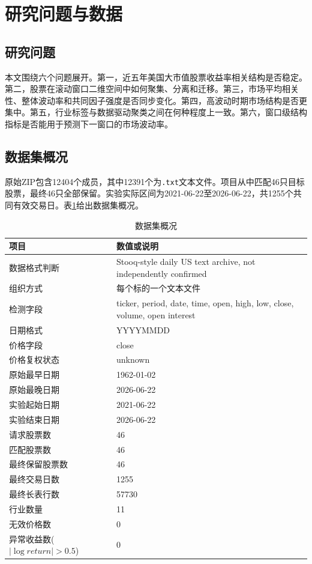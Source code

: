 \documentclass[UTF8,zihao=-4]{ctexart}
\begin{document}
\section{研究问题与数据}
\subsection{研究问题}
本文围绕六个问题展开。第一，近五年美国大市值股票收益率相关结构是否稳定。第二，股票在滚动窗口二维空间中如何聚集、分离和迁移。第三，市场平均相关性、整体波动率和共同因子强度是否同步变化。第四，高波动时期市场结构是否更集中。第五，行业标签与数据驱动聚类之间在何种程度上一致。第六，窗口级结构指标是否能用于预测下一窗口的市场波动率。

\subsection{数据集概况}
原始ZIP包含12404个成员，其中12391个为\texttt{.txt}文本文件。项目从中匹配46只目标股票，最终46只全部保留。实验实际区间为2021-06-22至2026-06-22，共1255个共同有效交易日。表\ref{tab:data-overview}给出数据集概况。

\begin{table}[H]
\centering
\caption{数据集概况}
\label{tab:data-overview}
\small
\begin{tabular}{p{}p{}}
\toprule
项目 & 数值或说明 \\
\midrule
数据格式判断 & Stooq-style daily US text archive, not independently confirmed \\
组织方式 & 每个标的一个文本文件 \\
检测字段 & ticker, period, date, time, open, high, low, close, volume, open interest \\
日期格式 & YYYYMMDD \\
价格字段 & close \\
价格复权状态 & unknown \\
原始最早日期 & 1962-01-02 \\
原始最晚日期 & 2026-06-22 \\
实验起始日期 & 2021-06-22 \\
实验结束日期 & 2026-06-22 \\
请求股票数 & 46 \\
匹配股票数 & 46 \\
最终保留股票数 & 46 \\
最终交易日数 & 1255 \\
最终长表行数 & 57730 \\
行业数量 & 11 \\
无效价格数 & 0 \\
异常收益数($|\log return|>0.5$) & 0 \\
\bottomrule
\end{tabular}
\end{table}
\end{document}
